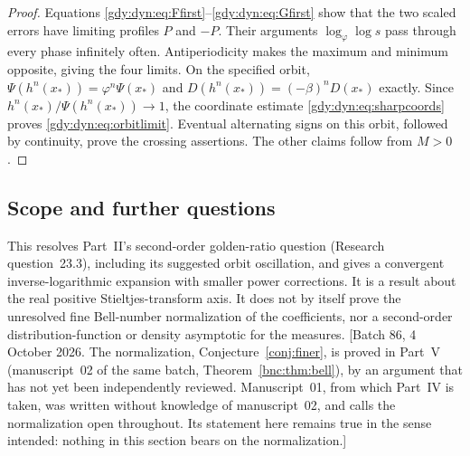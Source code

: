 \documentclass[11pt]{article}
\numberwithin{equation}{section}
\theoremstyle{definition}
\theoremstyle{remark}
\begin{document}
\begin{proof}
Equations \eqref{gdy:dyn:eq:Ffirst}--\eqref{gdy:dyn:eq:Gfirst} show that the
two scaled errors have limiting profiles $P$ and $-P$. Their arguments
$\log_\varphi\log s$ pass through every phase infinitely often.
Antiperiodicity makes the maximum and minimum opposite, giving the four
limits. On the specified orbit,
$\Psi(h^n(x_*))=\varphi^n\Psi(x_*)$ and
$D(h^n(x_*))=(-\beta)^nD(x_*)$ exactly. Since
$h^n(x_*)/\Psi(h^n(x_*))\to1$, the coordinate estimate
\eqref{gdy:dyn:eq:sharpcoords} proves \eqref{gdy:dyn:eq:orbitlimit}.
Eventual alternating signs on this orbit, followed by continuity, prove
the crossing assertions. The other claims follow from $M>0$.
\end{proof}

\subsection{Scope and further questions}
\label{gdy:dyn:sub:questions}

This resolves Part~II's second-order golden-ratio question
(Research question~23.3),
including its suggested orbit oscillation, and gives a convergent
inverse-logarithmic expansion with smaller power corrections. It is a
result about the real positive
Stieltjes-transform axis. It does not by itself prove the unresolved
fine Bell-number normalization of the coefficients, nor a second-order
distribution-function or density asymptotic for the measures.
[Batch 86, 4 October 2026. The normalization, Conjecture~\ref{conj:finer},
is proved in Part~V (manuscript~02 of the same batch,
Theorem~\ref{bnc:thm:bell}), by an argument that has not yet been
independently reviewed. Manuscript~01, from which Part~IV is taken, was
written without knowledge of manuscript~02, and calls the normalization
open throughout. Its statement here remains true in the sense intended:
nothing in this section bears on the normalization.]
\end{document}
